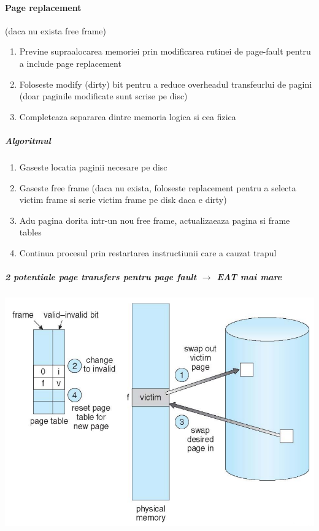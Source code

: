 \documentclass{article}
\begin{document}
\paragraph*{Page replacement} (daca nu exista free frame)
\begin{enumerate}
    \item Previne supraalocarea memoriei prin modificarea rutinei de page-fault pentru a include page replacement
    \item Foloseste modify (dirty) bit pentru a reduce overheadul transfeurlui de pagini (doar paginile modificate sunt scrise pe disc)
    \item Completeaza separarea dintre memoria logica si cea fizica
\end{enumerate}
\subparagraph*{Algoritmul}
\begin{enumerate}
    \item Gaseste locatia paginii necesare pe disc
    \item Gaseste free frame (daca nu exista, foloseste replacement pentru a selecta victim frame si scrie victim frame pe disk daca e dirty)
    \item Adu pagina dorita intr-un nou free frame, actualizaeaza pagina si frame tables
    \item Continua procesul prin restartarea instructiunii care a cauzat trapul
\end{enumerate}
\subparagraph*{2 potentiale page transfers pentru page fault $\rightarrow$ EAT mai mare}
\begin{center}
    \includegraphics[scale=0.3]{33-pagereplacement.png}
\end{center}
\end{document}
